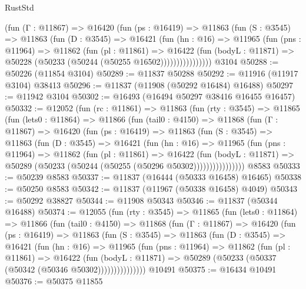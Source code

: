 \begin{lexlean}{RustStd}
\begin{coremodule}
              (fun (Γ : @11867) =>
              @16420
                (fun (ps : @16419) =>
                @11863
                  (fun (S : @3545) =>
                  @11863
                    (fun (D : @3545) =>
                    @16421
                      (fun (hn : @16) =>
                      @11965
                        (fun (pns : @11964) =>
                        @11862
                          (fun (pl : @11861) =>
                          @16422
                            (fun (bodyL : @11871) =>
                            @50228 (@50233 (@50244 (@50255 @16502))))))))))))))))
    @3104
@50288 := @50226 (@11854 @3104)
@50289 := @11837 @50288
@50292 := @11916 (@11917 @3104) @38413
@50296 := @11837 (@11908 (@50292 @16484) @16488)
@50297 := @11942 @3104
@50302 := @16493 (@16494 @50297 @38416 @16455 @16457)
@50332 := @12052
    (fun (rc : @11861) =>
    @11863
      (fun (rty : @3545) =>
      @11865
        (fun (lets0 : @11864) =>
        @11866
          (fun (tail0 : @4150) =>
          @11868
            (fun (Γ : @11867) =>
            @16420
              (fun (ps : @16419) =>
              @11863
                (fun (S : @3545) =>
                @11863
                  (fun (D : @3545) =>
                  @16421
                    (fun (hn : @16) =>
                    @11965
                      (fun (pns : @11964) =>
                      @11862
                        (fun (pl : @11861) =>
                        @16422
                          (fun (bodyL : @11871) =>
                          @50289 (@50233 (@50244 (@50255 (@50296 @50302))))))))))))))))
    @8583
@50333 := @50239 @8583
@50337 := @11837 (@16444 (@50333 @16458) @16465)
@50338 := @50250 @8583
@50342 := @11837 (@11967 (@50338 @16458) @4049)
@50343 := @50292 @38827
@50344 := @11908 @50343
@50346 := @11837 (@50344 @16488)
@50374 := @12055
    (fun (rty : @3545) =>
    @11865
      (fun (lets0 : @11864) =>
      @11866
        (fun (tail0 : @4150) =>
        @11868
          (fun (Γ : @11867) =>
          @16420
            (fun (ps : @16419) =>
            @11863
              (fun (S : @3545) =>
              @11863
                (fun (D : @3545) =>
                @16421
                  (fun (hn : @16) =>
                  @11965
                    (fun (pns : @11964) =>
                    @11862
                      (fun (pl : @11861) =>
                      @16422
                        (fun (bodyL : @11871) =>
                        @50289 (@50233 (@50337 (@50342 (@50346 @50302)))))))))))))))
    @10491
@50375 := @16434 @10491
@50376 := @50375 @11855

\end{coremodule}
\end{lexlean}
